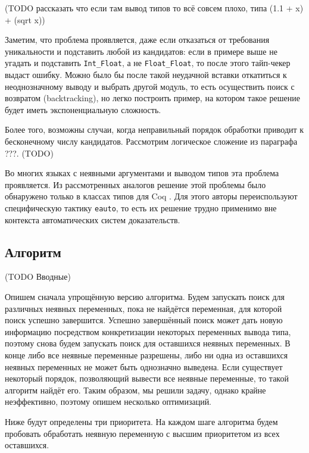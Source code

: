 \documentclass[../diploma.tex]{subfiles}
\begin{document}
(TODO рассказать что если там вывод типов то всё совсем плохо, типа (1.1 + x) + (sqrt x))

Заметим, что проблема проявляется, даже если отказаться от требования уникальности и подставить любой из кандидатов: если в примере выше не угадать и подставить \texttt{Int_Float}, а не \texttt{Float_Float}, то после этого тайп-чекер выдаст ошибку. Можно было бы после такой неудачной вставки откатиться к неоднозначному выводу и выбрать другой модуль, то есть осуществить поиск с возвратом (backtracking), но легко построить пример, на котором такое решение будет иметь экспоненциальную сложность.

Более того, возможны случаи, когда неправильный порядок обработки приводит к бесконечному числу кандидатов. Рассмотрим логическое сложение из параграфа ???. (TODO)

Во многих языках с неявными аргументами и выводом типов эта проблема проявляется. Из рассмотренных аналогов решение этой проблемы было обнаружено только в классах типов для Coq \cite{coq_typeclasses}. Для этого авторы переиспользуют специфическую тактику \texttt{eauto}, то есть их решение трудно применимо вне контекста автоматических систем доказательств.

\subsection{Алгоритм}

(TODO Вводные)

Опишем сначала упрощённую версию алгоритма. Будем запускать поиск для различных неявных переменных, пока не найдётся переменная, для которой поиск успешно завершится. Успешно завершённый поиск может дать новую информацию посредством конкретизации некоторых переменных вывода типа, поэтому снова будем запускать поиск для оставшихся неявных переменных. В конце либо все неявные переменные разрешены, либо ни одна из оставшихся неявных переменных не может быть однозначно выведена. Если существует некоторый порядок, позволяющий вывести все неявные переменные, то такой алгоритм найдёт его. Таким образом, мы решили задачу, однако крайне неэффективно, поэтому опишем несколько оптимизаций.

Ниже будут определены три приоритета. На каждом шаге алгоритма будем пробовать обработать неявную переменную с высшим приоритетом из всех оставшихся.
\end{document}
